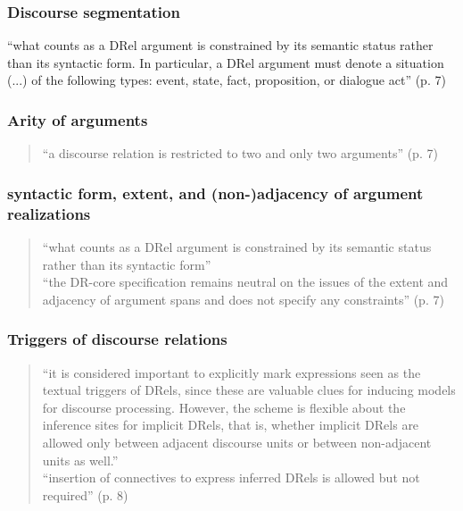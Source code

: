 \documentclass{udisc}
\begin{document}
\begin{itemize}

\subsubsection{Discourse segmentation}

“what counts as a DRel argument is constrained by its semantic status rather than its syntactic form. In particular, a DRel argument must denote a situation (...) of the following types: event, state, fact, proposition, or dialogue act” (p. 7)


\subsubsection{Arity of arguments}

\begin{quote}
    “a discourse relation is restricted to two and only two arguments” (p. 7)
\end{quote}


\subsubsection{syntactic form, extent, and (non-)adjacency of argument realizations}

\begin{quote}
“what counts as a DRel argument is constrained by its semantic status rather than its syntactic form”\\
“the DR-core specification remains neutral on the issues of the extent and adjacency of argument spans and does not specify any constraints” (p. 7)
\end{quote}

\subsubsection{Triggers of discourse relations}

\begin{quote}
“it is considered important to explicitly mark expressions seen as the textual triggers of DRels, since these are valuable clues for inducing models for discourse processing. However, the scheme is flexible about the inference sites for implicit DRels, that is, whether implicit DRels are allowed only between adjacent discourse units or between non-adjacent units as well.” \\
“insertion of connectives to express inferred DRels is allowed but not required” (p. 8)
\end{quote}


\end{itemize}
\end{document}
